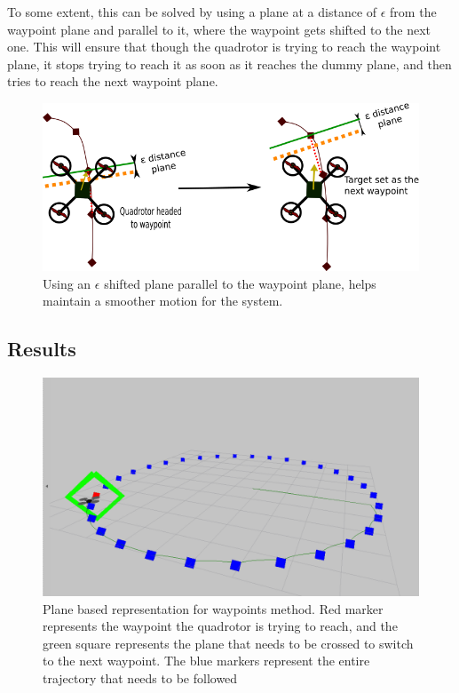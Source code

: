 \documentclass[hidelinks,BTech]{iitmdiss}
\begin{document}
To some extent, this can be solved by using a plane at a distance of $\epsilon$ from the waypoint plane and parallel to it, where the waypoint gets shifted to the next one. This will ensure that though the quadrotor is trying to reach the waypoint plane, it stops trying to reach it as soon as it reaches the dummy plane, and then tries to reach the next waypoint plane.
\begin{figure}[H]
  \centering
    \includegraphics[width=\textwidth]{Waypoints_epsilon.png}
    \caption{Using an $\epsilon$ shifted plane parallel to the waypoint plane, helps maintain a smoother motion for the system.}
\end{figure}

\subsection*{Results}
\begin{figure}[H]
  \centering
    \includegraphics[width=\textwidth]{Waypoints_plane.png}
    \caption{Plane based representation for waypoints method. Red marker represents the waypoint the quadrotor is trying to reach, and the green square represents the plane that needs to be crossed to switch to the next waypoint. The blue markers represent the entire trajectory that needs to be followed}
\end{figure}
\end{document}
